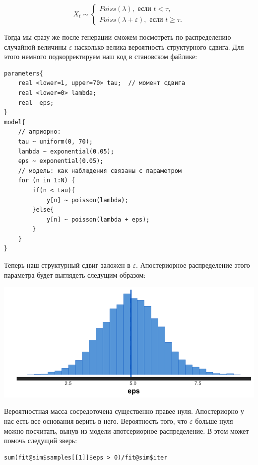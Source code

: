 \documentclass[12pt, a4paper, oneside]{extreport}
\def \e{\varepsilon}
\theoremstyle{plain}              %
\theoremstyle{definition}         %
\begin{document}
\begin{equation*}
X_t \sim \begin{cases}  Poiss(\lambda), \text{ если } t < \tau, \\  Poiss(\lambda + \varepsilon), \text{ если } t \ge \tau. \end{cases}
\end{equation*}

Тогда мы сразу же после генерации сможем посмотреть по распределению случайной величины $\varepsilon$ насколько велика вероятность структурного сдвига.  Для этого немного подкорректируем наш код в становском файлике:

\begin{verbatim}
parameters{
    real <lower=1, upper=70> tau;  // момент сдвига
    real <lower=0> lambda;
    real  eps;
}
model{
    // априорно:
    tau ~ uniform(0, 70); 
    lambda ~ exponential(0.05);
    eps ~ exponential(0.05);
    // модель: как наблюдения связаны с параметром
    for (n in 1:N) {
        if(n < tau){
            y[n] ~ poisson(lambda);
        }else{
            y[n] ~ poisson(lambda + eps);
        }
    }
}
\end{verbatim}

Теперь наш структурный сдвиг заложен в $\e$. Апостериорное распределение этого параметра будет выглядеть следущим образом:

\begin{center}
	\includegraphics[scale=0.25]{poiss_eps.png}
\end{center}

Вероятностная масса сосредоточена существенно правее нуля. Апостериорно у нас есть все основания верить в него. Вероятность того, что $\e$ больше нуля можно посчитать, вынув из модели апотсериорное распределение. В этом может помочь следущий зверь: 

\begin{verbatim} 
sum(fit@sim$samples[[1]]$eps > 0)/fit@sim$iter
\end{verbatim}
\end{document}
